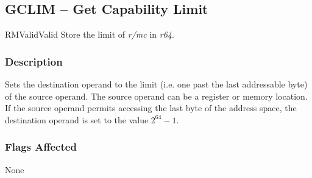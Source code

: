 \clearpage
{}
{}
\subsection*{GCLIM -- Get Capability Limit}

\begin{x86opcodetable}
  {RM}{Valid}{Valid}
  {Store the limit of \emph{r/mc} in \emph{r64}.}
\end{x86opcodetable}

\begin{x86opentable}
\end{x86opentable}

\subsubsection*{Description}

Sets the destination operand to the limit (i.e. one past the last
addressable byte) of the source operand.  The source operand can be a
register or memory location.  If the source operand permits accessing
the last byte of the address space, the destination operand is set to
the value $2^{64}-1$.

\subsubsection*{Flags Affected}

None
